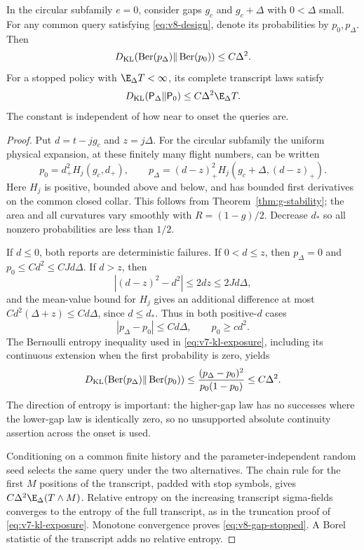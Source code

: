 \begin{lemma}
\label{lem:v8-gap-entropy}
In the circular subfamily $e=0$, consider gaps $g_c$ and
$g_c+\Delta$ with $0<\Delta$ small. For any common query satisfying
\eqref{eq:v8-design}, denote its probabilities by $p_0,p_\Delta$.
Then
\begin{equation}\label{eq:v8-gap-single}
 D_{\rm KL}(\operatorname{Ber}(p_\Delta)\Vert
                         \operatorname{Ber}(p_0))\le C\Delta^2.
\end{equation}
For a stopped policy with $\E_\Delta T<\infty$, its complete
transcript laws satisfy
\begin{equation}\label{eq:v8-gap-stopped}
 D_{\rm KL}(\mathsf P_\Delta\Vert\mathsf P_0)
                                  \le C\Delta^2\E_\Delta T.
\end{equation}
The constant is independent of how near to onset the queries are.
\end{lemma}
\begin{proof}
Put $d=t-jg_c$ and $z=j\Delta$. For the circular subfamily the
uniform physical expansion, at these finitely many flight numbers,
can be written
\[
 p_0=d_+^2 H_j(g_c,d_+),\qquad
 p_\Delta=(d-z)_+^2H_j(g_c+\Delta,(d-z)_+).
\]
Here $H_j$ is positive, bounded above and below, and has bounded first
derivatives on the common closed collar. This follows from
Theorem~\ref{thm:g-stability}; the area and all curvatures vary smoothly
with $R=(1-g)/2$. Decrease $d_*$ so all nonzero probabilities are less
than $1/2$.

If $d\le0$, both reports are deterministic failures. If $0<d\le z$,
then $p_\Delta=0$ and $p_0\le Cd^2\le CJd\Delta$. If $d>z$, then
\[
 |(d-z)^2-d^2|\le2dz\le2Jd\Delta,
\]
and the mean-value bound for $H_j$ gives an additional difference at
most $Cd^2(\Delta+z)\le Cd\Delta$, since $d\le d_*$. Thus in both
positive-$d$ cases
\[
               |p_\Delta-p_0|\le Cd\Delta,
               \qquad p_0\ge c d^2.
\]
The Bernoulli entropy inequality used in
\eqref{eq:v7-kl-exposure}, including its continuous extension when
the first probability is zero, yields
\[
 D_{\rm KL}(\operatorname{Ber}(p_\Delta)\Vert
                         \operatorname{Ber}(p_0))
 \le\frac{(p_\Delta-p_0)^2}{p_0(1-p_0)}\le C\Delta^2.
\]
The direction of entropy is important: the higher-gap law has no
successes where the lower-gap law is identically zero, so no unsupported
absolute continuity assertion across the onset is used.

Conditioning on a common finite history and the parameter-independent
random seed selects the same query under the two alternatives. The
chain rule for the first $M$ positions of the transcript, padded with
stop symbols, gives $C\Delta^2\E_\Delta(T\wedge M)$. Relative entropy
on the increasing transcript sigma-fields converges to the entropy of
the full transcript, as in the truncation proof of
\eqref{eq:v7-kl-exposure}. Monotone convergence proves
\eqref{eq:v8-gap-stopped}. A Borel statistic of the transcript adds no
relative entropy.
\end{proof}

